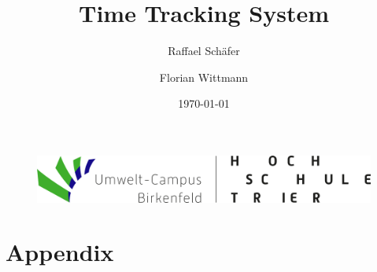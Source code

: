 \documentclass{article}
\title{Time Tracking System}
\author{Raffael Schäfer \and Florian Wittmann}
\date{\today}
\begin{document}
\maketitle
\begin{figure}[b!]
     \includegraphics[width=\linewidth]{./images/logos/UCB Logo.png}
     \label{fig:UCB Logo} %
\end{figure}
\newpage
\tableofcontents
\listoffigures
\listoftables
\printglossaries %
\newpage















\newpage
\section{Appendix}
\begin{appendix}
    \printbibliography
\end{appendix}
\end{document}
